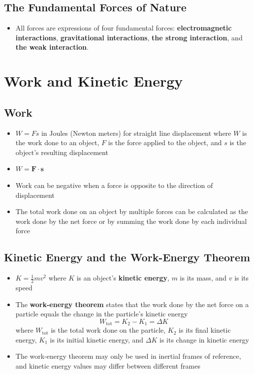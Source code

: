 \documentclass{article}
\begin{document}
\setcounter{subsection}{4}
\subsection{The Fundamental Forces of Nature}

\begin{itemize}
  \item All forces are expressions of four fundamental forces: \textbf{electromagnetic interactions}, \textbf{gravitational interactions}, \textbf{the strong interaction}, and \textbf{the weak interaction}.
\end{itemize}

\section{Work and Kinetic Energy}

\subsection{Work}

\begin{itemize}
  \item $W=Fs$ in Joules (Newton meters) for straight line displacement where $W$ is the work done to an object, $F$ is the force applied to the object, and $s$ is the object's resulting displacement

  \item $W=\mathbf{F}\cdot\mathbf{s}$

  \item Work can be negative when a force is opposite to the direction of displacement

  \item The total work done on an object by multiple forces can be calculated as the work done by the net force or by summing the work done by each individual force
\end{itemize}

\subsection{Kinetic Energy and the Work-Energy Theorem}

\begin{itemize}
  \item $K=\frac{1}{2}mv^2$ where $K$ is an object's \textbf{kinetic energy}, $m$ is its mass, and $v$ is its speed

  \item The \textbf{work-energy theorem} states that the work done by the net force on a particle equals the change in the particle's kinetic energy \[W_\textrm{tot}=K_2-K_1=\Delta K\] where $W_\textrm{tot}$ is the total work done on the particle, $K_2$ is its final kinetic energy, $K_1$ is its initial kinetic energy, and $\Delta K$ is its change in kinetic energy

  \item The work-energy theorem may only be used in inertial frames of reference, and kinetic energy values may differ between different frames
\end{itemize}
\end{document}
